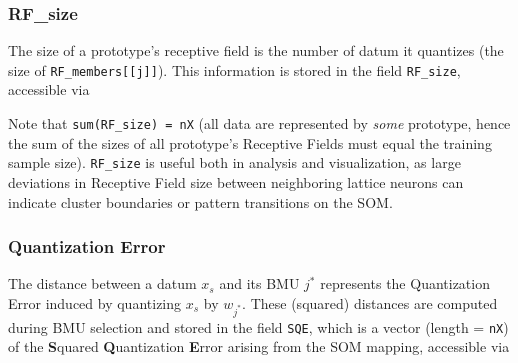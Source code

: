 \documentclass[]{article}
\newenvironment{Shaded}{\begin{snugshade}}{\end{snugshade}}
\newcommand{\CommentTok}[1]{\textcolor[rgb]{0.56,0.35,0.01}{\textit{#1}}}
\newcommand{\DataTypeTok}[1]{\textcolor[rgb]{0.13,0.29,0.53}{#1}}
\newcommand{\DecValTok}[1]{\textcolor[rgb]{0.00,0.00,0.81}{#1}}
\newcommand{\KeywordTok}[1]{\textcolor[rgb]{0.13,0.29,0.53}{\textbf{#1}}}
\newcommand{\NormalTok}[1]{#1}
\newcommand{\OperatorTok}[1]{\textcolor[rgb]{0.81,0.36,0.00}{\textbf{#1}}}
\begin{document}
\hypertarget{rf_size}{%
\subsubsection{RF\_size}\label{rf_size}}

The size of a prototype's receptive field is the number of datum it quantizes (the size of \texttt{RF\_members{[}{[}j{]}{]}}). This information is stored in the field \texttt{RF\_size}, accessible via

\begin{Shaded}
\end{Shaded}

Note that \texttt{sum(RF\_size)\ =\ nX} (all data are represented by \emph{some} prototype, hence the sum of the sizes of all prototype's Receptive Fields must equal the training sample size). \texttt{RF\_size} is useful both in analysis and visualization, as large deviations in Receptive Field size between neighboring lattice neurons can indicate cluster boundaries or pattern transitions on the SOM.

\hypertarget{quantization-error}{%
\subsubsection{Quantization Error}\label{quantization-error}}

The distance between a datum \(x_s\) and its BMU \(j^*\) represents the Quantization Error induced by quantizing \(x_s\) by \(w_{j^*}\). These (squared) distances are computed during BMU selection and stored in the field \texttt{SQE}, which is a vector (length = \texttt{nX}) of the \textbf{S}quared \textbf{Q}uantization \textbf{E}rror arising from the SOM mapping, accessible via

\begin{Shaded}
\end{Shaded}
\end{document}
